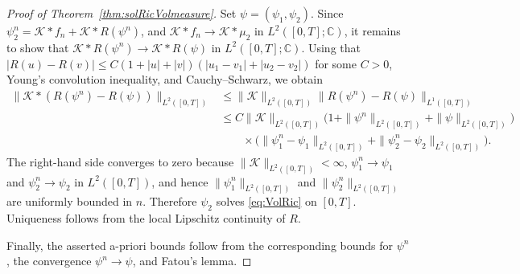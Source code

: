 \documentclass[10pt,a4paper,reqno]{amsart}
\theoremstyle{plain}
\theoremstyle{definition}
\theoremstyle{remark}
\theoremstyle{example}
\begin{document}
\begin{proof}[Proof of Theorem~\ref{thm:solRicVolmeasure}]
     Set $\psi=(\psi_1,\psi_2)$. Since $\psi_2^n = \mathcal{K}\ast f_n + \mathcal{K}\ast R(\psi^n)$, and $\mathcal{K}\ast f_n\to \mathcal{K}\ast\mu_2$ in $L^2([0,T];\mathbb{C})$, it remains to show that
     $\mathcal{K}\ast R(\psi^n)\to \mathcal{K}\ast R(\psi)$ in $L^2([0,T];\mathbb{C})$. Using that
     $|R(u)-R(v)|\le C(1+|u|+|v|)(|u_1-v_1|+|u_2-v_2|)$ for some $C>0$, Young's convolution inequality, and Cauchy--Schwarz, we obtain
     \begin{align*}
         \|\mathcal{K}\ast(R(\psi^n)-R(\psi))\|_{L^2([0,T])}
         &\le \|\mathcal{K}\|_{L^2([0,T])}\|R(\psi^n)-R(\psi)\|_{L^1([0,T])} \\
         &\le C\|\mathcal{K}\|_{L^2([0,T])}
             \bigl(1+\|\psi^n\|_{L^2([0,T])}+\|\psi\|_{L^2([0,T])}\bigr) \\
         &\qquad \times \bigl(\|\psi_1^n-\psi_1\|_{L^2([0,T])}
             +\|\psi_2^n-\psi_2\|_{L^2([0,T])}\bigr).
     \end{align*}
     The right-hand side converges to zero because $\|\mathcal{K}\|_{L^2([0,T])}<\infty$, $\psi_1^n\to\psi_1$ and $\psi_2^n\to\psi_2$ in $L^2([0,T])$, and hence $\|\psi_1^n\|_{L^2([0,T])}$ and $\|\psi_2^n\|_{L^2([0,T])}$ are uniformly bounded in $n$. Therefore $\psi_2$ solves \eqref{eq:VolRic} on $[0,T]$. Uniqueness follows from the local Lipschitz continuity of $R$.

     Finally, the asserted a-priori bounds follow from the corresponding bounds for $\psi^n$, the convergence $\psi^n\to\psi$, and Fatou's lemma.
 \end{proof}
\end{document}
